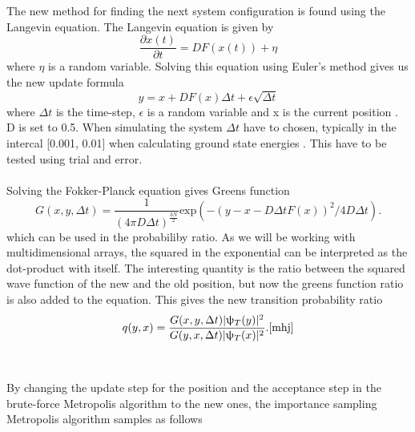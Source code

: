 \\
\\
The new method for finding the next system configuration is found using the Langevin equation. The Langevin equation is given by 
\begin{equation}
    \frac{\partial x(t)}{\partial t} = DF(x(t)) + \eta
\end{equation}
where $\eta$ is a random variable. Solving this equation using Euler's method gives us the new update formula
\begin{equation}
    y = x + DF(x)\Delta t + \epsilon\sqrt{\Delta t}
\end{equation}
where $\Delta t$ is the time-step, $\epsilon$ is a random variable  and x is the current position \cite{mhj}. D is set to 0.5. When simulating the system $\Delta t$ have to chosen, typically in the intercal [0.001, 0.01] when calculating ground state energies \cite{mhj}. This have to be tested using trial and error.  
\\
\\
Solving the Fokker-Planck equation gives  Greens function 
\begin{equation}
    G(x,y, \Delta t) = \frac{1}{(4\pi D \Delta t) ^\frac{3N}{2}}\text{exp}(-(y-x-D\Delta t F(x))^2/4D \Delta t). 
\end{equation} \cite{mhj}
which can be used in the probabiliby ratio. 
As we will be working with multidimensional arrays, the squared in the exponential can be interpreted as the dot-product with itself. The interesting quantity is the ratio between the squared wave function of the new and the old position, but now the greens function ratio is also added to the equation. This gives the new transition probability ratio
\begin{equation}
    q(y,x) = \frac{ G(x,y, \Delta t) |\uppsi_T(y)|^2 }{ G(y,x,\Delta t) |\uppsi_T(x)|^2 }. \cite{mhj}
\end{equation}
\\
\\
By changing the update step for the position and the acceptance step in the brute-force Metropolis algorithm to the new ones, the importance sampling Metropolis algorithm samples as follows
